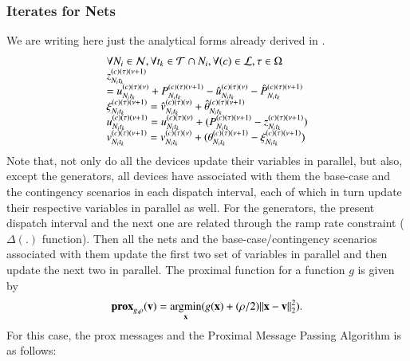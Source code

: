 \documentclass[preprint,12pt,3p]{elsarticle}
\begin{document}
\subsubsection{Iterates for Nets}We are writing here just the analytical forms already derived in \cite{KC:13}. 
\begin{equation}\label{ADMM_Nets_Lookahead_Demand}
\begin{array}{ll}
\forall N_i\in\mathcal{N},\forall t_k\in\mathcal{T}\cap N_i,\forall (c)\in\mathcal{L},\tau\in\Omega\notag\\
z_{{N_i}{t_k}}^{(c)(\tau)(\nu+1)}\\=u_{{N_i}{t_k}}^{(c)(\tau)(\nu)}+P_{{N_i}{t_k}}^{(c)(\tau)(\nu+1)}-\hat{u}_{{N_i}{t_k}}^{(c)(\tau)(\nu)}-\hat{P}_{{N_i}{t_k}}^{(c)(\tau)(\nu+1)}\\
\xi_{{N_i}{t_k}}^{(c)(\tau)(\nu+1)}=\hat{v}_{{N_i}{t_k}}^{(c)(\tau)(\nu)}+\hat{\theta}_{{N_i}{t_k}}^{(c)(\tau)(\nu+1)}\\
u_{{N_i}{t_k}}^{(c)(\tau)(\nu+1)}=u_{{N_i}{t_k}}^{(c)(\tau)(\nu)}+(P_{{N_i}{t_k}}^{(c)(\tau)(\nu+1)}-z_{{N_i}{t_k}}^{(c)(\tau)(\nu+1)})\\
v_{{N_i}{t_k}}^{(c)(\tau)(\nu+1)}=v_{{N_i}{t_k}}^{(c)(\tau)(\nu)}+(\theta_{{N_i}{t_k}}^{(c)(\tau)(\nu+1)}-\xi_{{N_i}{t_k}}^{(c)(\tau)(\nu+1)})
\end{array}
\end{equation}
Note that, not only do all the devices update their variables in parallel, but also, except the generators, all devices have associated with them the base-case and the contingency scenarios in each dispatch interval, each of which in turn update their respective variables in parallel as well. For the generators, the present dispatch interval and the next one are related through the ramp rate constraint ($\Delta (.)$ function). Then all the nets and the base-case/contingency scenarios associated with them update the first two set of variables in parallel and then update the next two in parallel. The proximal function for a function $g$ is given by
\[
\mathbf{prox}_{g,\rho}({\mathbf{v}}) = \mathop{\rm argmin}_{\mathbf{x}} (g({\mathbf{x}}) + (\rho/2)\|{\mathbf{x}} - {\mathbf{v}}\|_2^2).
\]
For this case, the prox messages and the Proximal Message Passing Algorithm is as follows:
\end{document}
